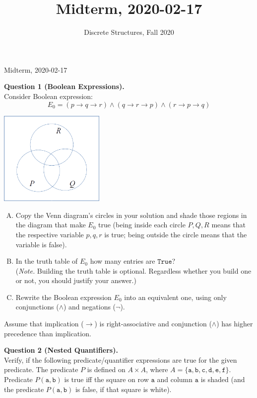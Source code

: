 \documentclass[jou]{apa6}
\title{Midterm, 2020-02-17}
\author{Discrete Structures, Fall 2020}
\affiliation{RBS}
\begin{document}
\thispagestyle{empty}

\twocolumn
{\Large Midterm, 2020-02-17}

\vspace{6pt}
{\bf Question 1 (Boolean Expressions).}\\
Consider Boolean expression:
$$E_0 = (p \rightarrow q \rightarrow r) \wedge (q \rightarrow r \rightarrow p) \wedge (r \rightarrow p \rightarrow q)$$
\begin{center}
\includegraphics[width=2in]{midterm/circles.png}
\end{center}

\begin{enumerate}[(A)]
\item Copy the Venn diagram's circles in your solution and shade those regions in the diagram that make $E_0$ true
(being inside each circle $P,Q,R$ means that the respective variable $p,q,r$ is true; being outside the circle means
that the variable is false). 
\item In the truth table of $E_0$ how many entries are $\mathtt{True}$?\\
({\em Note.} Building the truth table is optional. Regardless whether you build one or not, you should justify your answer.)
\item Rewrite the Boolean expression $E_0$ into an equivalent one, using 
only conjunctions ($\wedge$) and negations ($\neg$). 
\end{enumerate}

Assume that implication ($\rightarrow$) is right-associative 
and conjunction ($\wedge$) has higher precedence than implication. 



\vspace{10pt}
{\bf Question 2 (Nested Quantifiers).}\\
Verify, if the following predicate/quantifier expressions are true for the given predicate. 
The predicate $P$ is defined on $A \times A$, where
$A = \{ \mathtt{a},\mathtt{b},\mathtt{c},\mathtt{d},\mathtt{e},\mathtt{f} \}$. 
Predicate $P(\mathtt{a},\mathtt{b})$ is true iff the square on row $\mathtt{a}$
and column $\mathtt{a}$ is shaded (and the predicate $P(\mathtt{a},\mathtt{b})$ 
is false, if that square is white).
\end{document}
